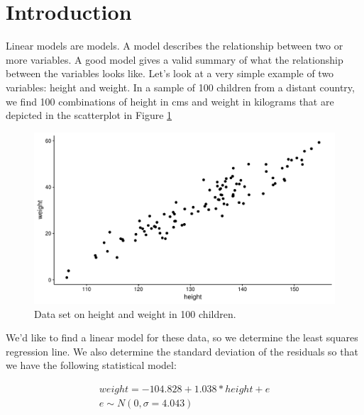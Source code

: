 \documentclass[]{book}\usepackage[]{graphicx}\usepackage[]{color}
\makeatletter
\def\maxwidth{ %
  \ifdim\Gin@nat@width>\linewidth
    \linewidth
  \else
    \Gin@nat@width
  \fi
}
\newenvironment{knitrout}{}{} %
\makeatother
\begin{document}
\section{Introduction}
Linear models are models. A model describes the relationship between two or more variables. A good model gives a valid summary of what the relationship between the variables looks like. Let's look at a very simple example of two variables: height and weight. In a sample of 100 children from a distant country, we find 100 combinations of height in cms and weight in kilograms that are depicted in the scatterplot in Figure \ref{fig:ass_1}

\begin{knitrout}
\color{fgcolor}\begin{figure}

{\centering \includegraphics[width=\maxwidth]{figure/ass_1-1} 

}

\caption[Data set on height and weight in 100 children]{Data set on height and weight in 100 children.}\label{fig:ass_1}
\end{figure}


\end{knitrout}

We'd like to find a linear model for these data, so we determine the least squares regression line. We also determine the standard deviation of the residuals so that we have the following statistical model:

\begin{eqnarray}
weight = -104.828 + 1.038* height + e \\
e \sim N(0, \sigma = 4.043) 
\end{eqnarray}
\end{document}
